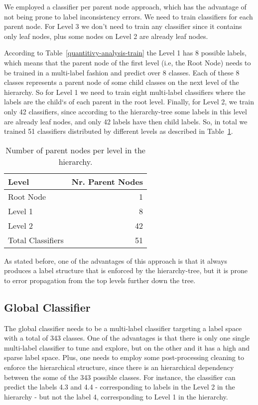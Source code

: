 \documentclass[11pt,a4paper]{article}
\begin{document}
We employed a classifier per parent node approach, which has the advantage of
not being prone to label inconsistency errors. We need to train classifiers for
each parent node. For Level 3 we don't need to train any classifier since it
contains only leaf nodes, plus some nodes on Level 2 are already leaf nodes.

According to Table~\ref{quantitivy-analysis-train} the Level 1 has 8 possible
labels, which means that the parent node of the first level (i.e, the Root Node)
needs to be trained in a multi-label fashion and predict over 8 classes. Each of
these 8 classes represents a parent node of some child classes on the
next level of the hierarchy. So for Level 1 we need to train eight multi-label
classifiers where the labels are the child`s of each parent in the root level.
Finally, for Level 2, we train only 42 classifiers, since according to the
hierarchy-tree some labels in this level are already leaf nodes, and only 42
labels have then child labels. So, in total we trained 51 classifiers
distributed by different levels as described in Table~\ref{parent-per-node-classifiers}.

\begin{table}[!h]
\begin{center}
\begin{tabular}{|l|r|}
\hline\centering\textbf{Level}  &  \textbf{Nr. Parent Nodes}    \\
\hline
Root Node         &  1       \\
Level 1           &  8       \\
Level 2           &  42      \\
\hline
Total Classifiers & 51       \\
\hline
\end{tabular}
\end{center}
\caption{\label{parent-per-node-classifiers}Number of parent nodes per level in
the hierarchy.}
\end{table}

As stated before, one of the advantages of this approach is that it always
produces a label structure that is enforced by the hierarchy-tree, but it is
prone to error propagation from the top levels further down the tree.


\subsection{Global Classifier}

The global classifier needs to be a multi-label classifier targeting a label
space with a total of 343 classes. One of the advantages is that there is only
one single multi-label classifier to tune and explore, but on the other and it
has a high and sparse label space. Plus, one needs to employ some post-processing
cleaning to enforce the hierarchical structure, since there is an hierarchical
dependency between the some of the 343 possible classes. For instance, the
classifier can predict the labels 4.3 and 4.4 - corresponding to labels in
the Level 2 in the hierarchy - but not the label 4, corresponding to Level 1
in the hierarchy.
\end{document}
